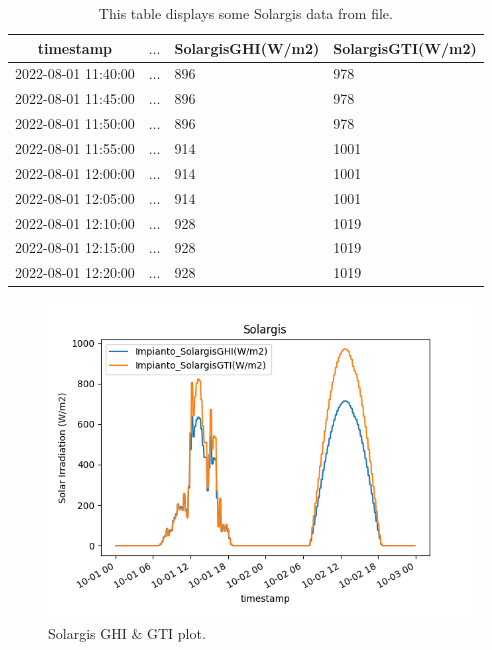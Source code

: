 \begin{table}[H]
	\begin{center}
		\begin{tabular}[c]{l|l|l|l}
			\multicolumn{1}{c|}{\textbf{timestamp}}         &
			\multicolumn{1}{c|}{\textbf{$\ldots$}}          &
			\multicolumn{1}{c|}{\textbf{SolargisGHI(W/m2)}} &
			\multicolumn{1}{c}{\textbf{SolargisGTI(W/m2)}}                          \\
			\hline
			2022-08-01 11:40:00                             & $\ldots$ & 896 & 978  \\
			2022-08-01 11:45:00                             & $\ldots$ & 896 & 978  \\
			2022-08-01 11:50:00                             & $\ldots$ & 896 & 978  \\
			2022-08-01 11:55:00                             & $\ldots$ & 914 & 1001 \\
			2022-08-01 12:00:00                             & $\ldots$ & 914 & 1001 \\
			2022-08-01 12:05:00                             & $\ldots$ & 914 & 1001 \\
			2022-08-01 12:10:00                             & $\ldots$ & 928 & 1019 \\
			2022-08-01 12:15:00                             & $\ldots$ & 928 & 1019 \\
			2022-08-01 12:20:00                             & $\ldots$ & 928 & 1019 \\

		\end{tabular}
		\caption{This table displays some Solargis data
			from  file.}\label{tab:solargis}
	\end{center}
\end{table}

\begin{figure}[H]
	\centering
	\includegraphics[width=.7\linewidth]{chapters/1_introduction/imgs/solargis.png}
	\caption{Solargis GHI \& GTI plot.}
	\label{fig:solargisplot}
\end{figure}


